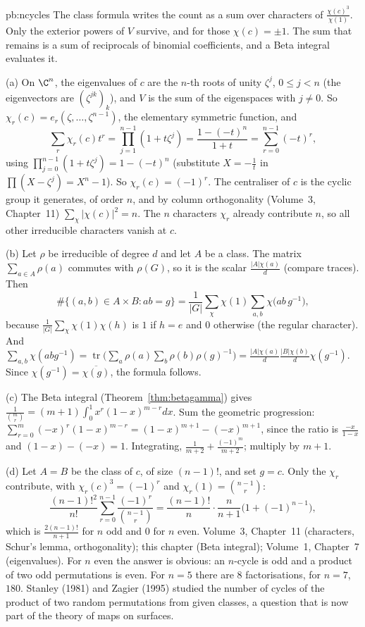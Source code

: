 \begin{solution}{pb:ncycles}
\idea The class formula writes the count as a sum over characters of $\frac{\chi(c)^3}{\chi(1)}$. Only the exterior powers of $V$ survive, and for those $\chi(c)=\pm1$. The sum that remains is a sum of reciprocals of binomial coefficients, and a Beta integral evaluates it.

\writeup (a) On $\C^n$, the eigenvalues of $c$ are the $n$-th roots of unity $\zeta^j$, $0\le j<n$ (the eigenvectors are
$(\zeta^{jk})_k$), and $V$ is the sum of the eigenspaces with $j\ne0$. So $\chi_r(c)=e_r(\zeta,\dots,\zeta^{n-1})$, the elementary
symmetric function, and
\[
\sum_r\chi_r(c)t^r=\prod_{j=1}^{n-1}(1+t\zeta^j)=\frac{1-(-t)^n}{1+t}=\sum_{r=0}^{n-1}(-t)^r,
\]
using $\prod_{j=0}^{n-1}(1+t\zeta^j)=1-(-t)^n$ (substitute $X=-\frac1t$ in $\prod(X-\zeta^j)=X^n-1$). So $\chi_r(c)=(-1)^r$. The
centraliser of $c$ is the cyclic group it generates, of order $n$, and by column orthogonality (Volume~3, Chapter~11)
$\sum_\chi|\chi(c)|^2=n$. The $n$ characters $\chi_r$ already contribute $n$, so all other irreducible characters vanish at $c$.

(b) Let $\rho$ be irreducible of degree $d$ and let $A$ be a class. The matrix $\sum_{a\in A}\rho(a)$ commutes with $\rho(G)$, so it is the
scalar $\frac{|A|\chi(a)}d$ (compare traces). Then
\[
\#\{(a,b)\in A\times B:ab=g\}=\frac1{|G|}\sum_\chi\chi(1)\sum_{a,b}\chi\bigl(ab\,g^{-1}\bigr),
\]
because $\frac1{|G|}\sum_\chi\chi(1)\chi(h)$ is $1$ if $h=e$ and $0$ otherwise (the regular character). And
$\sum_{a,b}\chi(abg^{-1})=\operatorname{tr}\bigl(\sum_a\rho(a)\sum_b\rho(b)\rho(g)^{-1}\bigr)=\frac{|A|\chi(a)}d\frac{|B|\chi(b)}d\chi(g^{-1})$. Since
$\chi(g^{-1})=\overline{\chi(g)}$, the formula follows.

(c) The Beta integral (Theorem~\ref{thm:betagamma}) gives $\frac1{\binom mr}=(m+1)\int_0^1x^r(1-x)^{m-r}dx$. Sum the geometric progression:
$\sum_{r=0}^m(-x)^r(1-x)^{m-r}=(1-x)^{m+1}-(-x)^{m+1}$, since the ratio is $\frac{-x}{1-x}$ and $(1-x)-(-x)=1$. Integrating,
$\frac1{m+2}+\frac{(-1)^m}{m+2}$; multiply by $m+1$.

(d) Let $A=B$ be the class of $c$, of size $(n-1)!$, and set $g=c$. Only the $\chi_r$ contribute, with $\chi_r(c)^3=(-1)^r$ and
$\chi_r(1)=\binom{n-1}r$:
\[
\frac{(n-1)!^2}{n!}\sum_{r=0}^{n-1}\frac{(-1)^r}{\binom{n-1}r}=\frac{(n-1)!}n\cdot\frac n{n+1}\bigl(1+(-1)^{n-1}\bigr),
\]
which is $\frac{2(n-1)!}{n+1}$ for $n$ odd and $0$ for $n$ even.
\tools Volume~3, Chapter~11 (characters, Schur's lemma, orthogonality); this chapter (Beta integral); Volume~1, Chapter~7 (eigenvalues).
\leads For $n$ even the answer is obvious: an $n$-cycle is odd and a product of two odd permutations is even. For $n=5$ there are $8$
factorisations, for $n=7$, $180$. Stanley (1981) and Zagier (1995) studied the number of cycles of the product of two random
permutations from given classes, a question that is now part of the theory of maps on surfaces.
\end{solution}

